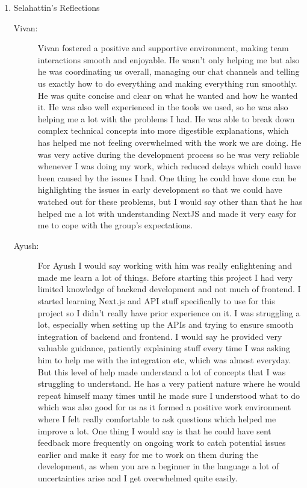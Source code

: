 \documentclass[a4paper, 12pt]{article}
\begin{document}
\begin{enumerate}
    \item Selahattin's Reflections
        \begin{description}
            \item[Vivan: ] Vivan fostered a positive and supportive environment, making team interactions smooth and enjoyable. He wasn’t only helping me but also he was coordinating us overall, managing our chat channels and telling us exactly how to do everything and making everything run smoothly. He was quite concise and clear on what he wanted and how he wanted it. He was also well experienced in the tools we used, so he was also helping me a lot with the problems I had. He was able to break down complex technical concepts into more digestible explanations, which has helped me not feeling overwhelmed with the work we are doing. He was very active during the development process so he was very reliable whenever I was doing my work, which reduced delays which could have been caused by the issues I had. One thing he could have done can be highlighting the issues in early development so that we could have watched out for these problems, but I would say other than that he has helped me a lot with understanding NextJS and made it very easy for me to cope with the group’s expectations.
            \item[Ayush: ] For Ayush I would say working with him was really enlightening and made me learn a lot of things. Before starting this project I had very limited knowledge of backend development and not much of frontend. I started learning Next.js and API stuff specifically to use for this project so I didn’t really have prior experience on it. I was struggling a lot, especially when setting up the APIs and trying to ensure smooth integration of backend and frontend. I would say he provided very valuable guidance, patiently explaining stuff every time I was asking him to help me with the integration etc, which was almost everyday. But this level of help made understand a lot of concepts that I was struggling to understand. He has a very patient nature where he would repeat himself many times until he made sure I understood what to do which was also good for us as it formed a positive work environment where I felt really comfortable to ask questions which helped me improve a lot. One thing I would say is that he could have sent feedback more frequently on ongoing work to catch potential issues earlier and make it easy for me to work on them during the development, as when you are a beginner in the language a lot of uncertainties arise and I get overwhelmed quite easily.

\end{description}
\end{enumerate}
\end{document}
